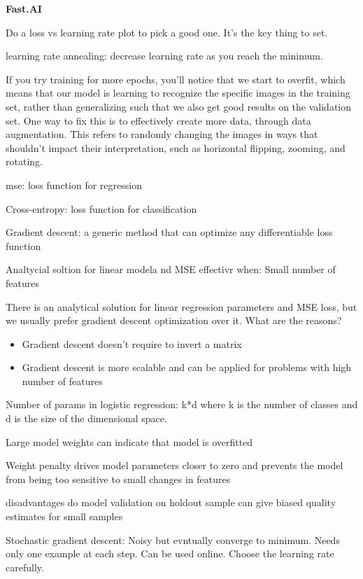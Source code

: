 \documentclass[]{book}
\providecommand{\tightlist}{%
  \setlength{\itemsep}{0pt}\setlength{\parskip}{0pt}}
\begin{document}
\textbf{Fast.AI}

Do a loss vs learning rate plot to pick a good one. It's the key thing
to set.

learning rate annealing: decrease learning rate as you reach the
minimum.

If you try training for more epochs, you'll notice that we start to
overfit, which means that our model is learning to recognize the
specific images in the training set, rather than generalizing such that
we also get good results on the validation set. One way to fix this is
to effectively create more data, through data augmentation. This refers
to randomly changing the images in ways that shouldn't impact their
interpretation, such as horizontal flipping, zooming, and rotating.

mse: loss function for regression

Cross-entropy: loss function for classification

Gradient descent: a generic method that can optimize any differentiable
loss function

Analtycial soltion for linear modela nd MSE effectivr when: Small number
of features

There is an analytical solution for linear regression parameters and MSE
loss, but we usually prefer gradient descent optimization over it. What
are the reasons?

\begin{itemize}
\tightlist
\item
  Gradient descent doesn't require to invert a matrix
\item
  Gradient descent is more scalable and can be applied for problems with
  high number of features
\end{itemize}

Number of params in logistic regression: k*d where k is the number of
classes and d is the size of the dimensional space.

Large model weights can indicate that model is overfitted

Weight penalty drives model parameters closer to zero and prevents the
model from being too sensitive to small changes in features

disadvantages do model validation on holdout sample can give biased
quality estimates for small samples

Stochastic gradient descent: Noisy but evntually converge to minimum.
Needs only one example at each step. Can be used online. Choose the
learning rate carefully.
\end{document}
